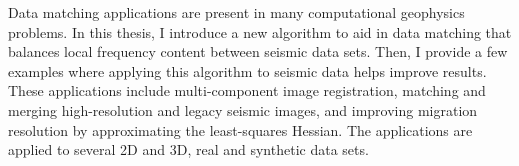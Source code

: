 Data matching applications are present in many computational geophysics problems.
In this thesis, I introduce a new algorithm to aid in data matching that balances local frequency content between seismic data sets.
Then, I provide a few examples where applying this algorithm to seismic data helps improve results.
These applications include multi-component image registration, matching and merging high-resolution and legacy seismic images, and improving migration resolution by approximating the least-squares Hessian.
The applications are applied to several 2D and 3D, real and synthetic data sets.

